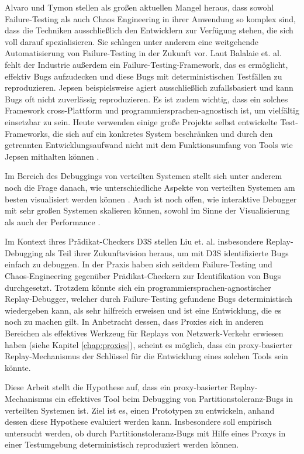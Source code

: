 \documentclass[12pt,a4paper]{report}
\begin{document}
Alvaro und Tymon \cite{abstracting_the_geniuses} stellen als großen aktuellen Mangel heraus, dass sowohl Failure-Testing als auch
Chaos Engineering in ihrer Anwendung so komplex sind, dass die Techniken ausschließlich den Entwicklern zur Verfügung stehen, die
sich voll darauf spezialisieren. Sie schlagen unter anderem eine weitgehende Automatisierung von Failure-Testing in der Zukunft
vor. Laut Balalaie et. al. \cite{failify_masters_thesis} fehlt der Industrie außerdem ein Failure-Testing-Framework, das es
ermöglicht, effektiv Bugs aufzudecken und diese Bugs mit deterministischen Testfällen zu reproduzieren. Jepsen beispielsweise
agiert ausschließlich zufallsbasiert und kann Bugs oft nicht zuverlässig reproduzieren. Es ist zudem wichtig, dass ein solches
Framework cross-Plattform und programmiersprachen-agnostisch ist, um vielfältig einsetzbar zu sein. Heute verwenden einige große
Projekte selbst entwickelte Test-Frameworks, die sich auf ein konkretes System beschränken und durch den getrennten
Entwicklungsaufwand nicht mit dem Funktionsumfang von Tools wie Jepsen mithalten können \cite{failify_masters_thesis}.

Im Bereich des Debuggings von verteilten Systemen stellt sich unter anderem noch die Frage danach, wie unterschiedliche Aspekte
von verteilten Systemen am besten visualisiert werden können \cite{oddity_graphical_debugger}. Auch ist noch offen, wie
interaktive Debugger mit sehr großen Systemen skalieren können, sowohl im Sinne der Visualisierung als auch der Performance
\cite{gotcha_interactive_debugger}.

Im Kontext ihres Prädikat-Checkers D3S stellen Liu et. al. \cite{d3s_predicate_checker}
insbesondere Replay-Debugging als Teil ihrer Zukunftsvision heraus, um mit D3S identifizierte Bugs einfach zu debuggen. In der
Praxis haben sich seitdem Failure-Testing und Chaos-Engineering gegenüber Prädikat-Checkern zur Iden\-tifika\-tion von Bugs durchgesetzt.
Trotzdem könnte sich ein programmiersprachen-agnostischer Replay-Debugger, welcher durch Failure-Testing gefundene Bugs
deterministisch wiedergeben kann, als sehr hilfreich erweisen und ist eine Entwicklung, die es noch zu machen gilt.
In Anbetracht dessen, dass Proxies sich in anderen Bereichen als effektives Werkzeug für Replays von Netzwerk-Verkehr erwiesen
haben (siehe Kapitel \ref{chap:proxies}), scheint es möglich, dass ein proxy-basierter Replay-Mechanismus der Schlüssel für die
Entwicklung eines solchen Tools sein könnte.

Diese Arbeit stellt die Hypothese auf, dass ein proxy-basierter Replay-Mech\-anismus ein effektives Tool beim Debugging von
Partitionstoleranz-Bugs in verteilten Systemen ist. Ziel ist es, einen Prototypen zu entwickeln, anhand dessen diese Hypothese
evaluiert werden kann. Insbesondere soll empirisch untersucht werden, ob durch Partitionstoleranz-Bugs mit Hilfe eines Proxys in
einer Testumgebung deterministisch reproduziert werden können.
\end{document}
